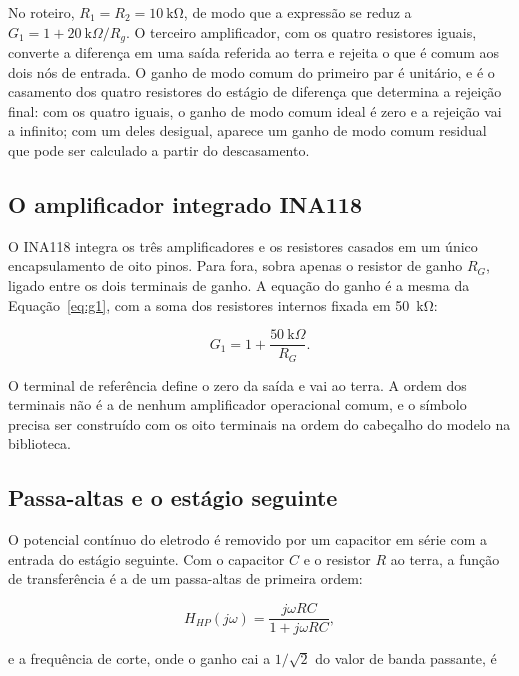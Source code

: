 \documentclass[11pt,a4paper]{article}
\begin{document}
No roteiro, $R_1 = R_2 = \SI{10}{\kilo\ohm}$, de modo que a expressão se reduz a $G_1 = 1 + 20~\text{k}\Omega / R_g$. O terceiro amplificador, com os quatro resistores iguais, converte a diferença em uma saída referida ao terra e rejeita o que é comum aos dois nós de entrada. O ganho de modo comum do primeiro par é unitário, e é o casamento dos quatro resistores do estágio de diferença que determina a rejeição final: com os quatro iguais, o ganho de modo comum ideal é zero e a rejeição vai a infinito; com um deles desigual, aparece um ganho de modo comum residual que pode ser calculado a partir do descasamento.

\subsection{O amplificador integrado INA118}

O INA118 integra os três amplificadores e os resistores casados em um único encapsulamento de oito pinos. Para fora, sobra apenas o resistor de ganho $R_G$, ligado entre os dois terminais de ganho. A equação do ganho é a mesma da Equação~\eqref{eq:g1}, com a soma dos resistores internos fixada em \SI{50}{\kilo\ohm}:

\begin{equation}
G_1 = 1 + \frac{50~\text{k}\Omega}{R_G} .
\label{eq:ina118}
\end{equation}

O terminal de referência define o zero da saída e vai ao terra. A ordem dos terminais não é a de nenhum amplificador operacional comum, e o símbolo precisa ser construído com os oito terminais na ordem do cabeçalho do modelo na biblioteca.

\subsection{Passa-altas e o estágio seguinte}

O potencial contínuo do eletrodo é removido por um capacitor em série com a entrada do estágio seguinte. Com o capacitor $C$ e o resistor $R$ ao terra, a função de transferência é a de um passa-altas de primeira ordem:

\begin{equation}
H_{HP}(j\omega) = \frac{j\omega R C}{1 + j\omega R C} ,
\label{eq:hp}
\end{equation}

e a frequência de corte, onde o ganho cai a $1/\sqrt{2}$ do valor de banda passante, é
\end{document}
